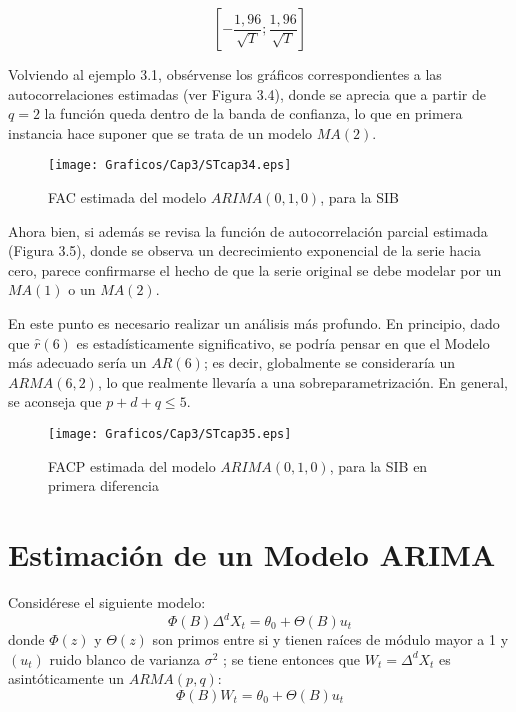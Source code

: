 \[
\left[ -\frac{1,96}{\sqrt T };\frac{1,96}{\sqrt T } \right]
\]

\begin{ejemplo}
Volviendo al ejemplo 3.1, obs\'{e}rvense los gr\'{a}ficos correspondientes a las autocorrelaciones estimadas (ver Figura 3.4), donde se aprecia que a partir de $q=2$ la funci\'{o}n queda dentro de la banda de confianza, lo que en primera instancia hace suponer que se trata de un modelo $MA(2).$

\begin{figure}[H]
\centering
\texttt{[image: Graficos/Cap3/STcap34.eps]}
\caption{FAC estimada del modelo $ARIMA(0,1,0)$, para la SIB}
\end{figure}

Ahora bien, si adem\'{a}s se revisa la funci\'{o}n de autocorrelaci\'{o}n parcial estimada (Figura 3.5), donde se observa un decrecimiento exponencial de la serie hacia cero, parece confirmarse el hecho de que la serie original se debe modelar por un $MA(1)$ o un $MA(2)$.\newline

En este punto es necesario realizar un an\'{a}lisis m\'{a}s profundo. En principio, dado que $\widehat{r}(6)$ es estad\'{i}sticamente significativo, se podr\'{i}a pensar en que el Modelo m\'{a}s adecuado ser\'{i}a un $AR(6)$; es decir, globalmente se considerar\'{i}a un $ARMA(6,2)$, lo que realmente llevar\'{i}a a una sobreparametrizaci\'{o}n. En general, se aconseja que $p+d+q\le 5$.

\begin{figure}[H]
\centering
\texttt{[image: Graficos/Cap3/STcap35.eps]}
\caption{FACP estimada del modelo $ARIMA(0,1,0)$, para la SIB en primera 
diferencia}
\end{figure}
\end{ejemplo}



\section{Estimaci\'{o}n de un Modelo ARIMA}

Consid\'{e}rese el siguiente modelo:
\[
 \Phi(B)\Delta^{d} X_{t}=  \theta_0  +  \Theta(B) u_{t}
\]
donde $\Phi(z)$ y $\Theta(z)$ son primos entre si y tienen ra\'{i}ces de m\'{o}dulo mayor a 1 y $(u_{t})$ ruido blanco de varianza $\sigma^{2}$ ; se tiene entonces que $W_{t} = \Delta^{d} X_{t}$ es asint\'{o}ticamente un $ARMA (p,q)$:
\[
 \Phi(B) W_{t} = \theta_{0} +  \Theta (B) u_{t}
\]


